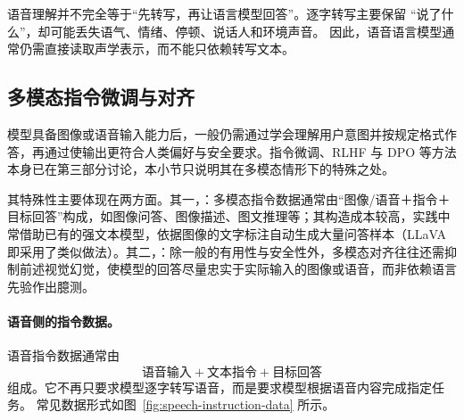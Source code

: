 \begin{importantnote}
  语音理解并不完全等于“先转写，再让语言模型回答”。逐字转写主要保留
  “说了什么”，却可能丢失语气、情绪、停顿、说话人和环境声音。
  因此，语音语言模型通常仍需直接读取声学表示，而不能只依赖转写文本。
\end{importantnote}

\subsection{多模态指令微调与对齐}
\label{sub:instruct}

模型具备图像或语音输入能力后，一般仍需通过学会理解用户意图并按规定格式作答，再通过使输出更符合人类偏好与安全要求。指令微调、RLHF 与 DPO 等方法本身已在第三部分讨论，本小节只说明其在多模态情形下的特殊之处。

其特殊性主要体现在两方面。其一，：多模态指令数据通常由“图像/语音＋指令＋目标回答”构成，如图像问答、图像描述、图文推理等；其构造成本较高，实践中常借助已有的强文本模型，依据图像的文字标注自动生成大量问答样本（LLaVA 即采用了类似做法）。其二，：除一般的有用性与安全性外，多模态对齐往往还需抑制前述视觉幻觉，使模型的回答尽量忠实于实际输入的图像或语音，而非依赖语言先验作出臆测。

\paragraph{语音侧的指令数据。}
语音指令数据通常由
\[
\text{语音输入}+\text{文本指令}+\text{目标回答}
\]
组成。它不再只要求模型逐字转写语音，而是要求模型根据语音内容完成指定任务。
常见数据形式如图~\ref{fig:speech-instruction-data} 所示。

